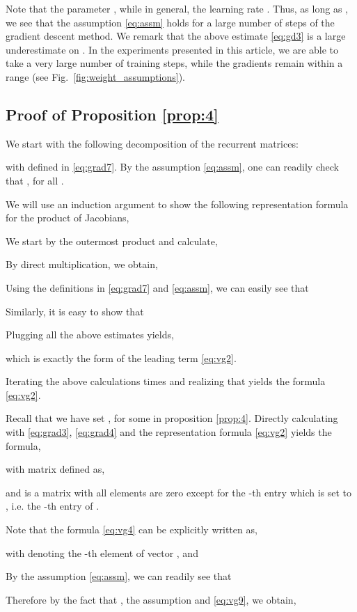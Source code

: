 \documentclass{article} \usepackage{iclr2021_conference,times}
\newcommand{\fref}[1] {Fig.~\ref{#1}}
\begin{document}
Note that the parameter , while in general, the learning rate . Thus, as long as , we see that the assumption \eqref{eq:assm} holds for a large number of steps of the gradient descent method. We remark that the above estimate \eqref{eq:gd3} is a large underestimate on . In the experiments presented in this article, we are able to take a very large number of training steps, while the gradients remain within a range (see \fref{fig:weight_assumptions}).
\subsection{Proof of Proposition \ref{prop:4}}
\label{app:proof_vanish}
We start with the following decomposition of the recurrent matrices:

with  defined in \eqref{eq:grad7}. By the assumption \eqref{eq:assm}, one can readily check that , for all .

We will use an induction argument to show the following representation formula for the product of Jacobians,




We start by the outermost product and calculate,

By direct multiplication, we obtain,

Using the definitions in \eqref{eq:grad7} and \eqref{eq:assm}, we can easily see that

Similarly, it is easy to show that

Plugging all the above estimates yields,

which is exactly the form of the leading term \eqref{eq:vg2}.

Iterating the above calculations  times and realizing that  yields the formula \eqref{eq:vg2}. 

Recall that we have set , for some  in proposition \ref{prop:4}. Directly calculating with \eqref{eq:grad3}, \eqref{eq:grad4} and the representation formula \eqref{eq:vg2} yields the formula, 

with matrix  defined as,

and  is a matrix with all elements are zero except for the -th entry which is set to , i.e. the -th entry of .


Note that the formula \eqref{eq:vg4} can be explicitly written as,

with  denoting the -th element of vector , and

By the assumption \eqref{eq:assm}, we can readily see that 

Therefore by the fact that , the assumption  and \eqref{eq:vg9}, we obtain,
\end{document}
